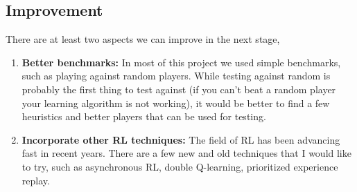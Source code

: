 \documentclass[a4paper]{article}
\begin{document}
\subsection{Improvement}
There are at least two aspects we can improve in the next stage,

\begin{enumerate}

    \item \textbf{Better benchmarks:} In most of this project we used simple benchmarks, such as playing against random players. While testing against random is probably the first thing to test against (if you can't beat a random player your learning algorithm is not working), it would be better to find a few heuristics and better players that can be used for testing.

    \item \textbf{Incorporate other RL techniques:} The field of RL has been advancing fast in recent years. There are a few new and old techniques that I would like to try, such as asynchronous RL, double Q-learning, prioritized experience replay.

\end{enumerate}







\end{document}

